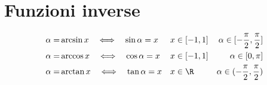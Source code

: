 \section{Funzioni inverse}
\begin{align*}
\alpha=&\arcsin x\quad\Longleftrightarrow\quad\sin\alpha=x&& x\in[-1,1]&\alpha\in[-\dfrac{\pi}{2},\dfrac{\pi}{2}]\\
\alpha=&\arccos x\quad\Longleftrightarrow\quad\cos\alpha=x&&x\in[-1,1]&\alpha\in[0,\pi]\\
\alpha=&\arctan x\quad\Longleftrightarrow\quad\tan\alpha=x&& x\in\R
&\alpha\in(-\dfrac{\pi}{2},\dfrac{\pi}{2})
\end{align*}		